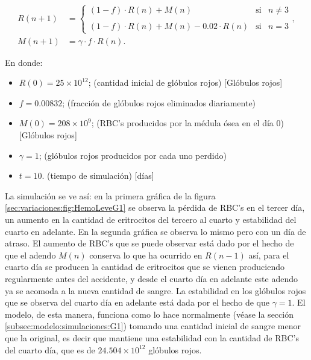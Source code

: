 \begin{align}\label{eq:HemoLeveMal}
    R(n+1) &= \left\{ \begin{array}{lcc} (1-f)\cdot R(n)+M(n) & \textrm{si} & n \neq 3 \\ \\ (1-f)\cdot R(n)+M(n)-0.02\cdot R(n) & \textrm{si} & n = 3\end{array} \right., \\
    M(n+1) &=\gamma \cdot f \cdot R(n). \nonumber
\end{align}

En donde:
\begin{itemize}
    \item $R(0) = 25\times 10^{12}$; (cantidad inicial de glóbulos rojos) [Glóbulos rojos]
    \item $f=0.00832$; (fracción de glóbulos rojos eliminados diariamente)
    \item $M(0) = 208 \times 10^{9}$; (RBC's producidos por la médula ósea en el día 0) [Glóbulos rojos]
    \item $\gamma=1$; (glóbulos rojos producidos por cada uno perdido)
    \item $t = 10$. (tiempo de simulación) [días]
\end{itemize}

La simulación se ve así: en la primera gráfica de la figura \ref{sec:variaciones:fig:HemoLeveG1} se observa la pérdida de RBC's en el tercer día, un aumento en la cantidad de eritrocitos del tercero al cuarto y estabilidad del cuarto en adelante. En la segunda gráfica se observa lo mismo pero con un día de atraso. El aumento de RBC's que se puede observar está dado por el hecho de que el adendo $M(n)$ conserva lo que ha ocurrido en $R(n-1)$ así, para el cuarto día se producen la cantidad de eritrocitos que se vienen produciendo regularmente antes del accidente, y desde el cuarto día en adelante este adendo ya se acomoda a la nueva cantidad de sangre. La estabilidad en los glóbulos rojos que se observa del cuarto día en adelante está dada por el hecho de que $\gamma = 1$. El modelo, de esta manera, funciona como lo hace normalmente (véase la sección \ref{subsec:modelo:simulaciones:G1}) tomando una cantidad inicial de sangre menor que la original, es decir que mantiene una estabilidad con la cantidad de RBC's del cuarto día, que es de $24.504\times 10^{12}$ glóbulos rojos. 

